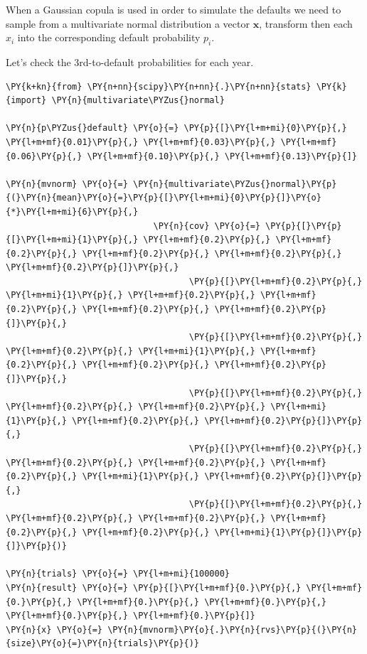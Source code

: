 When a Gaussian copula is used in order to simulate the defaults we need to sample from a multivariate normal distribution a vector $\mathbf{x}$, transform then each $x_i$ into the corresponding default probability $p_i$.

Let's check the 3rd-to-default probabilities for each year.
\begin{tcolorbox}[breakable, size=fbox, boxrule=1pt, pad at break*=1mm,colback=cellbackground, colframe=cellborder]
\begin{Verbatim}[commandchars=\\\{\}]
\PY{k+kn}{from} \PY{n+nn}{scipy}\PY{n+nn}{.}\PY{n+nn}{stats} \PY{k}{import} \PY{n}{multivariate\PYZus{}normal}
	
\PY{n}{p\PYZus{}default} \PY{o}{=} \PY{p}{[}\PY{l+m+mi}{0}\PY{p}{,} \PY{l+m+mf}{0.01}\PY{p}{,} \PY{l+m+mf}{0.03}\PY{p}{,} \PY{l+m+mf}{0.06}\PY{p}{,} \PY{l+m+mf}{0.10}\PY{p}{,} \PY{l+m+mf}{0.13}\PY{p}{]}
	
\PY{n}{mvnorm} \PY{o}{=} \PY{n}{multivariate\PYZus{}normal}\PY{p}{(}\PY{n}{mean}\PY{o}{=}\PY{p}{[}\PY{l+m+mi}{0}\PY{p}{]}\PY{o}{*}\PY{l+m+mi}{6}\PY{p}{,}
                             \PY{n}{cov} \PY{o}{=} \PY{p}{[}\PY{p}{[}\PY{l+m+mi}{1}\PY{p}{,} \PY{l+m+mf}{0.2}\PY{p}{,} \PY{l+m+mf}{0.2}\PY{p}{,} \PY{l+m+mf}{0.2}\PY{p}{,} \PY{l+m+mf}{0.2}\PY{p}{,} \PY{l+m+mf}{0.2}\PY{p}{]}\PY{p}{,}
                                    \PY{p}{[}\PY{l+m+mf}{0.2}\PY{p}{,} \PY{l+m+mi}{1}\PY{p}{,} \PY{l+m+mf}{0.2}\PY{p}{,} \PY{l+m+mf}{0.2}\PY{p}{,} \PY{l+m+mf}{0.2}\PY{p}{,} \PY{l+m+mf}{0.2}\PY{p}{]}\PY{p}{,}
                                    \PY{p}{[}\PY{l+m+mf}{0.2}\PY{p}{,} \PY{l+m+mf}{0.2}\PY{p}{,} \PY{l+m+mi}{1}\PY{p}{,} \PY{l+m+mf}{0.2}\PY{p}{,} \PY{l+m+mf}{0.2}\PY{p}{,} \PY{l+m+mf}{0.2}\PY{p}{]}\PY{p}{,}
                                    \PY{p}{[}\PY{l+m+mf}{0.2}\PY{p}{,} \PY{l+m+mf}{0.2}\PY{p}{,} \PY{l+m+mf}{0.2}\PY{p}{,} \PY{l+m+mi}{1}\PY{p}{,} \PY{l+m+mf}{0.2}\PY{p}{,} \PY{l+m+mf}{0.2}\PY{p}{]}\PY{p}{,}
                                    \PY{p}{[}\PY{l+m+mf}{0.2}\PY{p}{,} \PY{l+m+mf}{0.2}\PY{p}{,} \PY{l+m+mf}{0.2}\PY{p}{,} \PY{l+m+mf}{0.2}\PY{p}{,} \PY{l+m+mi}{1}\PY{p}{,} \PY{l+m+mf}{0.2}\PY{p}{]}\PY{p}{,}
                                    \PY{p}{[}\PY{l+m+mf}{0.2}\PY{p}{,} \PY{l+m+mf}{0.2}\PY{p}{,} \PY{l+m+mf}{0.2}\PY{p}{,} \PY{l+m+mf}{0.2}\PY{p}{,} \PY{l+m+mf}{0.2}\PY{p}{,} \PY{l+m+mi}{1}\PY{p}{]}\PY{p}{]}\PY{p}{)}
	
\PY{n}{trials} \PY{o}{=} \PY{l+m+mi}{100000}
\PY{n}{result} \PY{o}{=} \PY{p}{[}\PY{l+m+mf}{0.}\PY{p}{,} \PY{l+m+mf}{0.}\PY{p}{,} \PY{l+m+mf}{0.}\PY{p}{,} \PY{l+m+mf}{0.}\PY{p}{,} \PY{l+m+mf}{0.}\PY{p}{,} \PY{l+m+mf}{0.}\PY{p}{]}
\PY{n}{x} \PY{o}{=} \PY{n}{mvnorm}\PY{o}{.}\PY{n}{rvs}\PY{p}{(}\PY{n}{size}\PY{o}{=}\PY{n}{trials}\PY{p}{)}
	

\end{Verbatim}
\end{tcolorbox}
